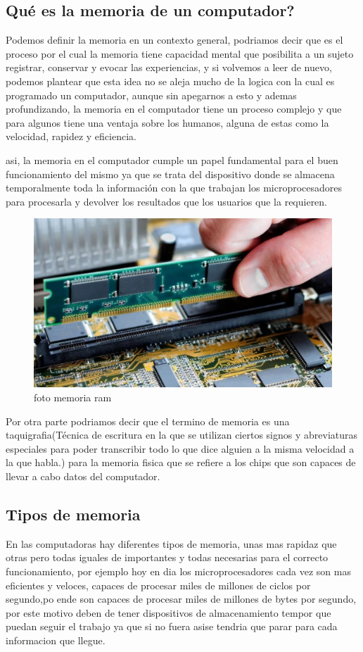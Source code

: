 \documentclass{article}
\begin{document}
    \subsection{Qué es la memoria de un computador?}
    Podemos definir la memoria en un contexto general, podriamos decir que es el proceso por el cual la memoria tiene capacidad mental que posibilita a un sujeto registrar, conservar y evocar las experiencias\cite{hipocampo}, y si volvemos a leer de nuevo, podemos plantear que esta idea no se aleja mucho de la logica con la cual es programado un computador, aunque sin apegarnos a esto y ademas profundizando, la memoria en el computador tiene un proceso complejo y que para algunos tiene una ventaja sobre los humanos, alguna de estas como la velocidad, rapidez y eficiencia.
    
    asi, la memoria en el computador cumple un papel fundamental para el buen funcionamiento del mismo  ya que se trata del dispositivo donde se almacena temporalmente toda la información con la que trabajan los microprocesadores para procesarla y devolver los resultados que los usuarios que la requieren.

    \begin{figure}[h]
    \includegraphics[width=6 cm]{imagenes/tipo_memoria.jpg}
    \centering
    \caption{foto memoria ram}
    \label{fig:tipo_memoria}
    \end{figure}

    Por otra parte podriamos decir que el termino de memoria es una taquigrafia(Técnica de escritura en la que se utilizan ciertos signos y abreviaturas especiales para poder transcribir todo lo que dice alguien a la misma velocidad a la que habla.) para la memoria fisica que se refiere a los chips que son capaces de llevar a cabo datos del computador.
    
    \subsection{Tipos de memoria}
    En las computadoras hay diferentes tipos de memoria, unas mas rapidaz que otras pero todas iguales de importantes y todas necesarias para el correcto funcionamiento, por ejemplo hoy en dia los microprocesadores cada vez son mas eficientes y veloces, capaces de procesar miles de millones de ciclos por segundo,po ende son capaces de procesar 
    miles de millones de bytes por segundo, por este motivo deben de tener dispositivos de almacenamiento tempor que puedan seguir el trabajo ya que si no fuera asise tendria que parar para cada informacion que llegue.
\end{document}
